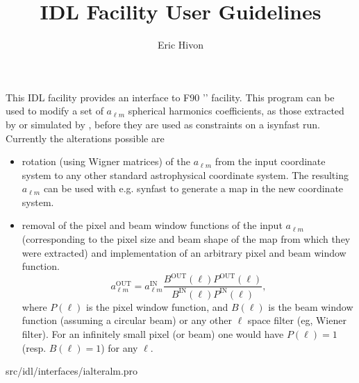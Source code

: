 
\sloppy

\title{\healpix IDL Facility User Guidelines}
 \section[ialteralm]{ }
\label{idl:ialteralm}
\author{Eric Hivon}

\begin{facility}
{This IDL facility provides an interface to F90 '' facility. 
This program can be used to modify a set of $a_{\ell m}$ spherical harmonics
  coefficients, as those extracted by  or 
  simulated by , before
  they are used as constraints on a isynfast run. Currently the alterations
  possible are %
\begin{itemize}
    \item rotation (using Wigner matrices) of the $a_{\ell m}$ from the input
    coordinate system to any other standard astrophysical coordinate system. The
    resulting $a_{\ell m}$ can be used with e.g. synfast to generate a map in the
    new coordinate system.
    \item removal of the pixel and beam window functions of the input
  $a_{\ell m}$ (corresponding to the pixel size and beam shape of the map from which
  they were extracted) and implementation of an arbitrary pixel and beam window
  function. 
 \begin{equation} a_{\ell m}^\mathrm{OUT} = a_{\ell m}^\mathrm{IN} 
 \frac{B^\mathrm{OUT}(\ell) P^\mathrm{OUT}(\ell)}{B^\mathrm{IN}(\ell) 
 P^\mathrm{IN}(\ell)}, \label{eq:alteralm} \end{equation}
where $P(\ell)$ is the pixel window function, and $B(\ell)$ is the beam window
 function (assuming a circular beam) or any other $\ell$ space filter (eg,
 Wiener filter). For an infinitely small pixel (or beam) one would have $P(\ell) =
 1$ (resp. $B(\ell) = 1$) for any $\ell$.
\end{itemize}
}
{src/idl/interfaces/ialteralm.pro}
\end{facility}


